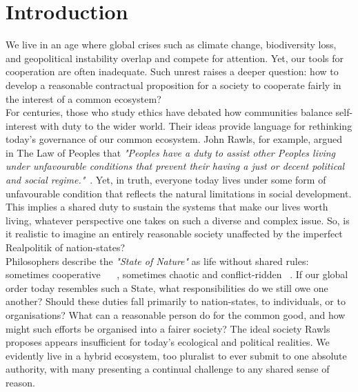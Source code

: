 \section{Introduction}

We live in an age where global crises such as climate change, biodiversity loss, and geopolitical instability overlap and compete for attention.
Yet, our tools for cooperation are often inadequate.
Such unrest raises a deeper question: how to develop a reasonable contractual proposition for a society to cooperate fairly in the interest of a common ecosystem?\\

For centuries, those who study ethics have debated how communities balance self-interest with duty to the wider world.
Their ideas provide language for rethinking today’s governance of our common ecosystem.
John Rawls, for example, argued in The Law of Peoples that \emph{"Peoples have a duty to assist other Peoples living under unfavourable conditions that prevent their having a just or decent political and social regime."}~\cite{jr2}.
Yet, in truth, everyone today lives under some form of unfavourable condition that reflects the natural limitations in social development.
This implies a shared duty to sustain the systems that make our lives worth living, whatever perspective one takes on such a diverse and complex issue.
So, is it realistic to imagine an entirely reasonable society unaffected by the imperfect Realpolitik of nation-states?\\

Philosophers describe the \emph{"State of Nature"} as life without shared rules: sometimes cooperative ~\cite{jl1} ~\cite{rn1}, sometimes chaotic and conflict-ridden ~\cite{th1}.
If our global order today resembles such a State, what responsibilities do we still owe one another?
Should these duties fall primarily to nation-states, to individuals, or to organisations?
What can a reasonable person do for the common good, and how might such efforts be organised into a fairer society?
The ideal society Rawls proposes appears insufficient for today’s ecological and political realities.
We evidently live in a hybrid ecosystem, too pluralist to ever submit to one absolute authority, with many presenting a continual challenge to any shared sense of reason.\\

